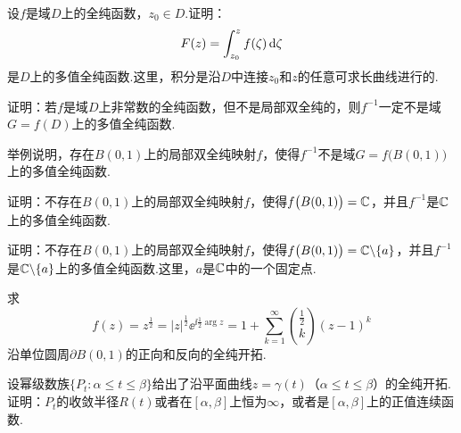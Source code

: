 \begin{xiti}\hypertarget{xiti6.3}{}
  \item 设$f$是域$D$上的全纯函数，$z_0\in D$.证明：
        \[
          F(z) = \int_{z_0}^zf(\zeta)\mathop{}\!\mathrm{d} \zeta
        \]
        是$D$上的多值全纯函数.这里，积分是沿$D$中连接$z_0$和$z$的任意可求长曲线进行的.
  \item 证明：若$f$是域$D$上非常数的全纯函数，但不是局部双全纯的，则$f^{-1}$一定不是域$G=f(D)$上的多值全纯函数.
  \item \hypertarget{xiti6.3.3}{} 举例说明，存在$B(0,1)$上的局部双全纯映射$f$，使得$f^{-1}$不是域$G=f\big(B(0,1)\big)$上的多值全纯函数.
  \item \hypertarget{xiti6.3.4}{} 证明：不存在$B(0,1)$上的局部双全纯映射$f$，使得$f\big(B(0,1)\big)=\mathbb C$，并且$f^{-1}$是$\mathbb C$上的多值全纯函数.
  \item 证明：不存在$B(0,1)$上的局部双全纯映射$f$，使得$f\big(B(0,1)\big)=\mathbb C\backslash\{a\}$，并且$f^{-1}$是$\mathbb C\backslash\{a\}$上的多值全纯函数.这里，$a$是$\mathbb C$中的一个固定点.
  \item 求
       \[
         f(z) = z^{\frac12} = |z|^{\frac12}\ee^{\ii\frac12\arg z} = 1+\sum_{k=1}^\infty
         \binom{\frac12}{k}(z-1)^k
       \]
       沿单位圆周$\partial B(0,1)$的正向和反向的全纯开拓.
  \item 设幂级数族$\{P_t:\alpha\le t\le\beta\}$给出了沿平面曲线$z=\gamma(t)$（$\alpha\le t\le\beta$）的全纯开拓.证明：$P_t$的收敛半径$R(t)$或者在$[\alpha,\beta]$上恒为$\infty$，或者是$[\alpha,\beta]$上的正值连续函数.
\end{xiti} 

